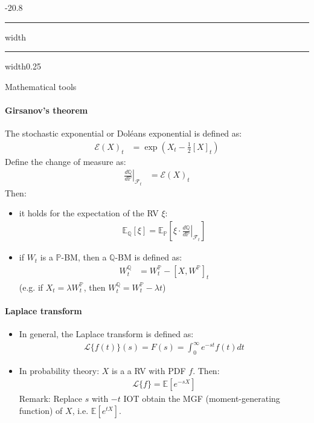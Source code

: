 \documentclass[a4paper,landscape,8pt,fleqn]{scrartcl}
\makeatletter
\renewcommand{\subsection}{\@startsection{subsection}{1}{0mm}%
{-2\baselineskip}{0.8\baselineskip}%
{\hrule depth 0.2pt width\columnwidth\hrule depth0.75pt
width0.25\columnwidth\vspace*{1.2em}\large\bfseries}}
\makeatother
\begin{document}
\begin{multicols*}{4}
\subsection{Mathematical tools}

\paragraph{Girsanov's theorem}
The stochastic exponential or Doléans exponential is defined as:
\begin{align*}
\mathcal{E}(X)_t &= \exp \left( X_t - \frac{1}{2} [X]_t \right)
\end{align*}
Define the change of measure as:
\begin{align*}
\left. \frac{d\mathbb{Q}}{d\mathbb{P}} \right|_{\mathcal{F}_t} &= \mathcal{E}(X)_t
\end{align*}
Then:
\begin{itemize}
\item it holds for the expectation of the RV $\xi$:
\begin{align*}
\mathbb{E}_\mathbb{Q}[\xi] = \mathbb{E}_\mathbb{P}\left[ \xi \cdot \left. \frac{d\mathbb{Q}}{d\mathbb{P}} \right|_{\mathcal{F}_t} \right]
\end{align*}
\item if $W_t$ is a $\mathbb{P}$-BM, then a $\mathbb{Q}$-BM is defined as:
\begin{align*}
W_t^\mathbb{Q} &= W_t^\mathbb{P} - \left[ X,W^\mathbb{P} \right]_t
\end{align*}
(e.g. if $X_t = \lambda W_t^\mathbb{P}$, then $W_t^\mathbb{Q} = W_t^\mathbb{P} - \lambda t$)
\end{itemize}

\paragraph{Laplace transform}
\begin{itemize}
\item In general, the Laplace transform is defined as:
\begin{align*}
\mathcal{L}\lbrace f(t) \rbrace(s) = F(s) = \int_0^\infty e^{-s t} f(t) dt
\end{align*}
\item In probability theory: $X$ is a a RV with PDF $f$. Then:
\begin{align*}
\mathcal{L}\lbrace f \rbrace = \mathbb{E} \left[ e^{-s X} \right]
\end{align*}
Remark: Replace $s$ with $-t$ IOT obtain the MGF (moment-generating function) of $X$, i.e. $\mathbb{E} \left[ e^{t X} \right]$.
\end{itemize}


\end{multicols*}
\end{document}
